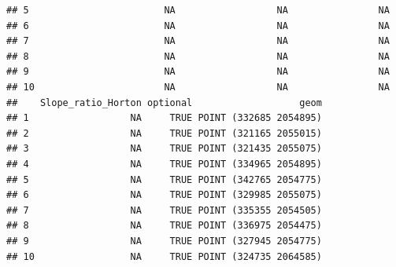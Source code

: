 \documentclass[11pt,]{article}
\begin{document}
\begin{verbatim}
## 5                        NA                  NA                NA
## 6                        NA                  NA                NA
## 7                        NA                  NA                NA
## 8                        NA                  NA                NA
## 9                        NA                  NA                NA
## 10                       NA                  NA                NA
##    Slope_ratio_Horton optional                   geom
## 1                  NA     TRUE POINT (332685 2054895)
## 2                  NA     TRUE POINT (321165 2055015)
## 3                  NA     TRUE POINT (321435 2055075)
## 4                  NA     TRUE POINT (334965 2054895)
## 5                  NA     TRUE POINT (342765 2054775)
## 6                  NA     TRUE POINT (329985 2055075)
## 7                  NA     TRUE POINT (335355 2054505)
## 8                  NA     TRUE POINT (336975 2054475)
## 9                  NA     TRUE POINT (327945 2054775)
## 10                 NA     TRUE POINT (324735 2064585)
\end{verbatim}
\end{document}
